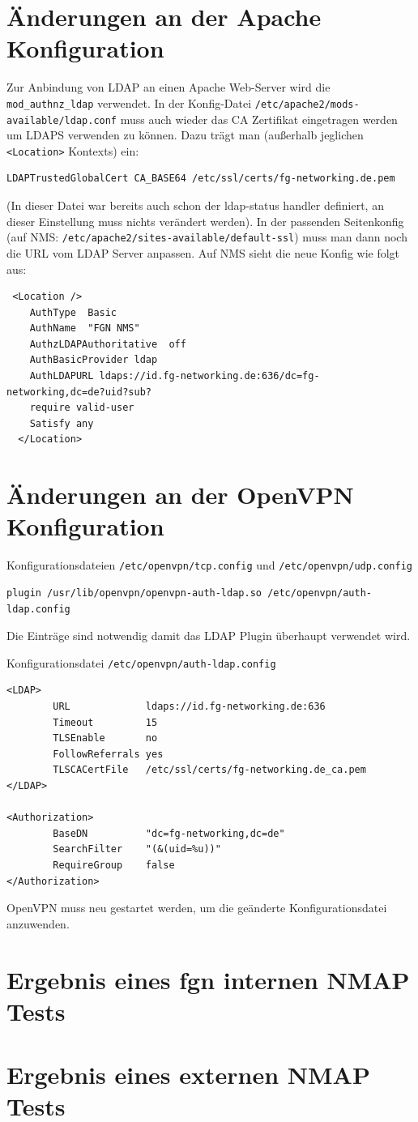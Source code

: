 \documentclass[11pt,a4paper,titlepage=firstiscover,headsepline,bibtotoc]{scrartcl} %
\begin{document}
\section{Änderungen an der Apache Konfiguration}\label{sec:Apache-Konfig}
Zur Anbindung von LDAP an einen Apache Web-Server wird die \texttt{mod\_authnz\_ldap} verwendet. In der Konfig-Datei \texttt{/etc/apache2/mods-available/ldap.conf} muss auch wieder das CA Zertifikat eingetragen werden um LDAPS verwenden zu können. Dazu trägt man (außerhalb jeglichen \texttt{<Location>} Kontexts) ein:
\begin{lstlisting}
LDAPTrustedGlobalCert CA_BASE64 /etc/ssl/certs/fg-networking.de.pem
\end{lstlisting}
(In dieser Datei war bereits auch schon der ldap-status handler definiert, an dieser Einstellung muss nichts verändert werden). In der passenden Seitenkonfig (auf NMS: \texttt{/etc/apache2/sites-available/default-ssl}) muss man dann noch die URL vom LDAP Server anpassen. Auf NMS sieht die neue Konfig wie folgt aus:
\begin{lstlisting}
 <Location />
    AuthType  Basic
    AuthName  "FGN NMS"
    AuthzLDAPAuthoritative  off
    AuthBasicProvider ldap
    AuthLDAPURL ldaps://id.fg-networking.de:636/dc=fg-networking,dc=de?uid?sub?
    require valid-user
    Satisfy any
  </Location>
\end{lstlisting}

\newpage
\section{Änderungen an der OpenVPN Konfiguration}\label{sec:VPN-Konfig}
Konfigurationsdateien \texttt{/etc/openvpn/tcp.config} und \texttt{/etc/openvpn/udp.config}
\begin{lstlisting}
plugin /usr/lib/openvpn/openvpn-auth-ldap.so /etc/openvpn/auth-ldap.config
\end{lstlisting}
Die Einträge sind notwendig damit das LDAP Plugin überhaupt verwendet wird.

Konfigurationsdatei \texttt{/etc/openvpn/auth-ldap.config}
\begin{lstlisting}
<LDAP>
        URL             ldaps://id.fg-networking.de:636
        Timeout         15
        TLSEnable       no
        FollowReferrals yes
        TLSCACertFile   /etc/ssl/certs/fg-networking.de_ca.pem
</LDAP>

<Authorization>
        BaseDN          "dc=fg-networking,dc=de"
        SearchFilter    "(&(uid=%u))"
        RequireGroup    false
</Authorization>
\end{lstlisting}
OpenVPN muss neu gestartet werden, um die geänderte Konfigurationsdatei anzuwenden.

\newpage
\section{Ergebnis eines fgn internen NMAP Tests}\label{sec:NMAP-Test-int}



\newpage
\section{Ergebnis eines externen NMAP Tests}\label{sec:NMAP-Test-ext}

\end{document}

